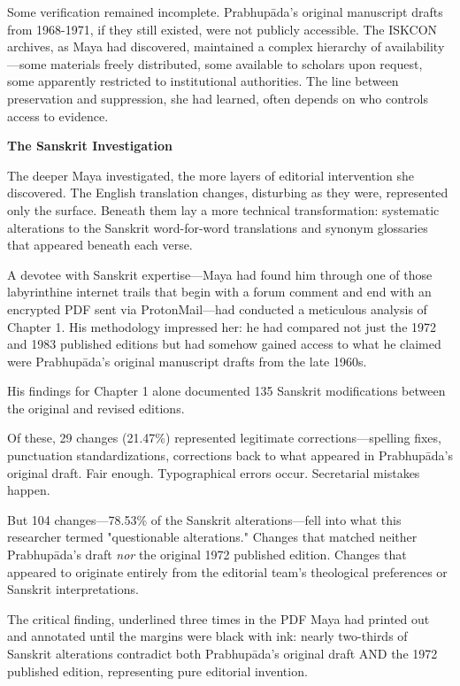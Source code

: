 \documentclass[12pt,twoside]{book}
\begin{document}
Some verification remained incomplete. Prabhupāda's original manuscript drafts from 1968-1971, if they still existed, were not publicly accessible. The ISKCON archives, as Maya had discovered, maintained a complex hierarchy of availability—some materials freely distributed, some available to scholars upon request, some apparently restricted to institutional authorities. The line between preservation and suppression, she had learned, often depends on who controls access to evidence.

\textbf{\textbf{The Sanskrit Investigation}}

The deeper Maya investigated, the more layers of editorial intervention she discovered. The English translation changes, disturbing as they were, represented only the surface. Beneath them lay a more technical transformation: systematic alterations to the Sanskrit word-for-word translations and synonym glossaries that appeared beneath each verse.

A devotee with Sanskrit expertise—Maya had found him through one of those labyrinthine internet trails that begin with a forum comment and end with an encrypted PDF sent via ProtonMail—had conducted a meticulous analysis of Chapter 1. His methodology impressed her: he had compared not just the 1972 and 1983 published editions but had somehow gained access to what he claimed were Prabhupāda's original manuscript drafts from the late 1960s.

His findings for Chapter 1 alone documented 135 Sanskrit modifications between the original and revised editions.

Of these, 29 changes (21.47\%) represented legitimate corrections—spelling fixes, punctuation standardizations, corrections back to what appeared in Prabhupāda's original draft. Fair enough. Typographical errors occur. Secretarial mistakes happen.

But 104 changes—78.53\% of the Sanskrit alterations—fell into what this researcher termed "questionable alterations." Changes that matched neither Prabhupāda's draft \emph{nor} the original 1972 published edition. Changes that appeared to originate entirely from the editorial team's theological preferences or Sanskrit interpretations.

The critical finding, underlined three times in the PDF Maya had printed out and annotated until the margins were black with ink: nearly two-thirds of Sanskrit alterations contradict both Prabhupāda's original draft AND the 1972 published edition, representing pure editorial invention.
\end{document}
